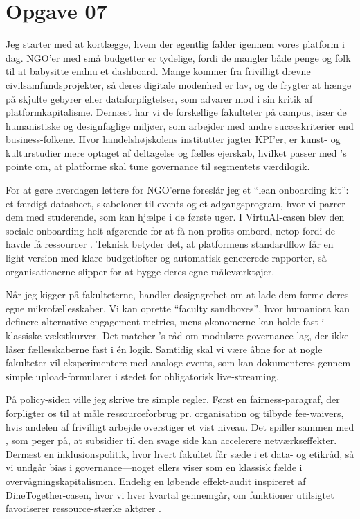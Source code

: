 \section*{Opgave 07}

Jeg starter med at kortlægge, hvem der egentlig falder igennem vores platform i dag. NGO'er med små budgetter er tydelige, fordi de mangler både penge og folk til at babysitte endnu et dashboard. Mange kommer fra frivilligt drevne civilsamfundsprojekter, så deres digitale modenhed er lav, og de frygter at hænge på skjulte gebyrer eller dataforpligtelser, som \citet{Srnicek2017} advarer mod i sin kritik af platformkapitalisme. Dernæst har vi de forskellige fakulteter på campus, især de humanistiske og designfaglige miljøer, som arbejder med andre succeskriterier end business-folkene. Hvor handelshøjskolens institutter jagter KPI'er, er kunst- og kulturstudier mere optaget af deltagelse og fælles ejerskab, hvilket passer med \citet{Choudary2016}'s pointe om, at platforme skal tune governance til segmentets værdilogik.

For at gøre hverdagen lettere for NGO'erne foreslår jeg et ``lean onboarding kit'': et færdigt datasheet, skabeloner til events og et adgangsprogram, hvor vi parrer dem med studerende, som kan hjælpe i de første uger. I VirtuAI-casen blev den sociale onboarding helt afgørende for at få non-profits ombord, netop fordi de havde få ressourcer \citep{Gunasilan2024}. Teknisk betyder det, at platformens standardflow får en light-version med klare budgetlofter og automatisk genererede rapporter, så organisationerne slipper for at bygge deres egne måleværktøjer.

Når jeg kigger på fakulteterne, handler designgrebet om at lade dem forme deres egne mikrofællesskaber. Vi kan oprette ``faculty sandboxes'', hvor humaniora kan definere alternative engagement-metrics, mens økonomerne kan holde fast i klassiske vækstkurver. Det matcher \citet{Reillier2017}'s råd om modulære governance-lag, der ikke låser fællesskaberne fast i én logik. Samtidig skal vi være åbne for at nogle fakulteter vil eksperimentere med analoge events, som kan dokumenteres gennem simple upload-formularer i stedet for obligatorisk live-streaming.

På policy-siden ville jeg skrive tre simple regler. Først en fairness-paragraf, der forpligter os til at måle ressourceforbrug pr. organisation og tilbyde fee-waivers, hvis andelen af frivilligt arbejde overstiger et vist niveau. Det spiller sammen med \citet{ShapiroVarian1999}, som peger på, at subsidier til den svage side kan accelerere netværkseffekter. Dernæst en inklusionspolitik, hvor hvert fakultet får sæde i et data- og etikråd, så vi undgår bias i governance---noget \citet{Zuboff2019} ellers viser som en klassisk fælde i overvågningskapitalismen. Endelig en løbende effekt-audit inspireret af DineTogether-casen, hvor vi hver kvartal gennemgår, om funktioner utilsigtet favoriserer ressource-stærke aktører \citep{Rennella2023}.


